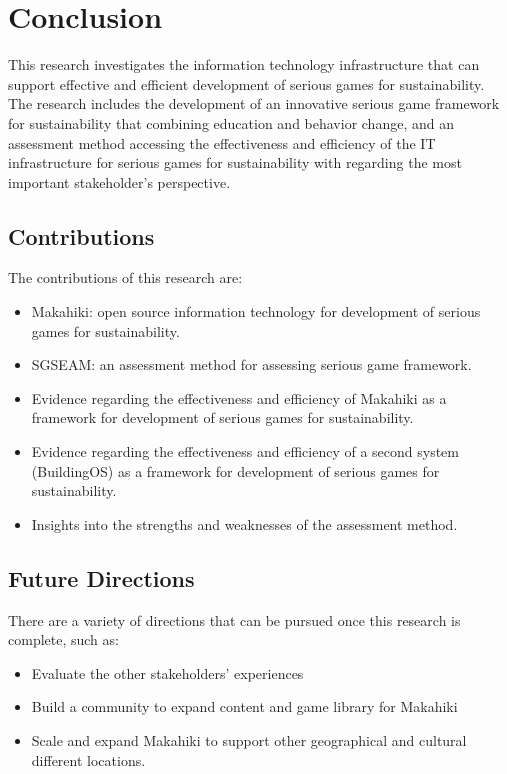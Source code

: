\chapter{Conclusion}
\label{cha:conclusion}

This research investigates the information technology infrastructure that can support effective and efficient development of serious games for sustainability. The research includes the development of an innovative serious game framework for sustainability that combining education and behavior change, and an assessment method accessing the effectiveness and efficiency of the IT infrastructure for serious games for sustainability with regarding the most important stakeholder's perspective.

\section{Contributions}

The contributions of this research are:

\begin{itemize}
	\item Makahiki: open source information technology for development of serious games for sustainability.
	\item SGSEAM: an assessment method for assessing serious game framework.
	\item Evidence regarding the effectiveness and efficiency of Makahiki as a framework for development of serious games for sustainability.
	\item Evidence regarding the effectiveness and efficiency of a second system (BuildingOS) as a framework for development of serious games for sustainability.
	\item Insights into the strengths and weaknesses of the assessment method.
\end{itemize}

\section{Future Directions}

There are a variety of directions that can be pursued once this research is complete, such as:

\begin{itemize}
	\item Evaluate the other stakeholders’ experiences

    \item Build a community to expand content and game library for Makahiki

    \item Scale and expand Makahiki to support other geographical and cultural different locations.

\end{itemize}

